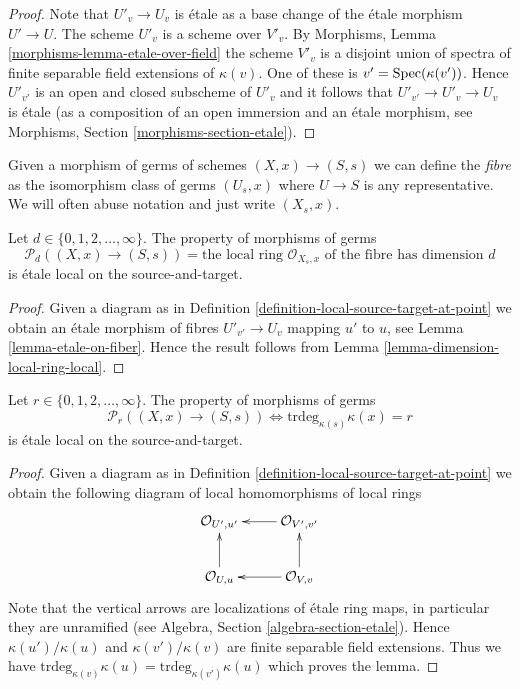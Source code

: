 \begin{proof}
Note that $U'_v \to U_v$ is \'etale as a base change of the \'etale
morphism $U' \to U$. The scheme $U'_v$ is a scheme over $V'_v$. By
Morphisms, Lemma \ref{morphisms-lemma-etale-over-field}
the scheme $V'_v$ is a disjoint union of spectra
of finite separable field extensions of $\kappa(v)$.
One of these is $v' = \mathop{\mathrm{Spec}}(\kappa(v'))$. Hence
$U'_{v'}$ is an open and closed subscheme of $U'_v$ and it follows
that $U'_{v'} \to U'_v \to U_v$ is \'etale (as a composition of an
open immersion and an \'etale morphism, see
Morphisms, Section \ref{morphisms-section-etale}).
\end{proof}

\noindent
Given a morphism of germs of schemes $(X, x) \to (S, s)$
we can define the {\it fibre} as the isomorphism class of germs
$(U_s, x)$ where $U \to S$ is any representative. We will often abuse notation
and just write $(X_s, x)$.

\begin{lemma}
\label{lemma-dimension-local-ring-fibre}
Let $d \in \{0, 1, 2, \ldots, \infty\}$.
The property of morphisms of germs
$$
\mathcal{P}_d((X, x) \to (S, s)) =
\text{the local ring }
\mathcal{O}_{X_s, x}
\text{ of the fibre has dimension }d
$$
is \'etale local on the source-and-target.
\end{lemma}

\begin{proof}
Given a diagram as in
Definition \ref{definition-local-source-target-at-point}
we obtain an \'etale morphism of fibres
$U'_{v'} \to U_v$ mapping $u'$ to $u$, see
Lemma \ref{lemma-etale-on-fiber}.
Hence the result follows from
Lemma \ref{lemma-dimension-local-ring-local}.
\end{proof}

\begin{lemma}
\label{lemma-transcendence-degree-at-point}
Let $r \in \{0, 1, 2, \ldots, \infty\}$.
The property of morphisms of germs
$$
\mathcal{P}_r((X, x) \to (S, s))
\Leftrightarrow
\text{trdeg}_{\kappa(s)} \kappa(x) = r
$$
is \'etale local on the source-and-target.
\end{lemma}

\begin{proof}
Given a diagram as in
Definition \ref{definition-local-source-target-at-point}
we obtain the following diagram of local homomorphisms of local rings
$$
\xymatrix{
\mathcal{O}_{U', u'} & \mathcal{O}_{V', v'} \ar[l] \\
\mathcal{O}_{U, u} \ar[u] & \mathcal{O}_{V, v} \ar[l] \ar[u]
}
$$
Note that the vertical arrows are localizations of \'etale ring maps,
in particular they are unramified (see
Algebra, Section \ref{algebra-section-etale}).
Hence $\kappa(u')/\kappa(u)$ and $\kappa(v')/\kappa(v)$
are finite separable field extensions.
Thus we have
$\text{trdeg}_{\kappa(v)} \kappa(u) = \text{trdeg}_{\kappa(v')} \kappa(u)$
which proves the lemma.
\end{proof}

